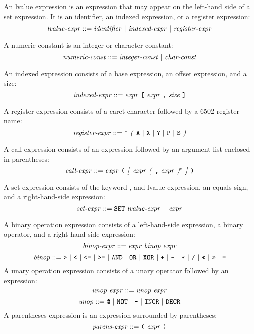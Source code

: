 \documentclass[10pt]{article}
\begin{document}
  An lvalue expression is an expression
that may appear on the left-hand side of a set expression.  It is an
identifier, an indexed expression, or a register expression:
%
$$\mbox{\textit{lvalue-expr}} ::= \mbox{\ensuremath{\mbox{\textit{identifier}}} $|$
  \ensuremath{\mbox{\textit{indexed-expr}}} $|$ \ensuremath{\mbox{\textit{register-expr}}}}$$

  A numeric constant is an integer or
character constant:
%
$$\mbox{\textit{numeric-const}} ::= \mbox{\ensuremath{\mbox{\textit{integer-const}}} $|$
  \ensuremath{\mbox{\textit{char-const}}}}$$
%

 An indexed expression consists of a
base expression, an offset expression, and a size:
%
$$\mbox{\textit{indexed-expr}} ::= \mbox{\ensuremath{\mbox{\textit{expr}}} \texttt{[}
    \ensuremath{\mbox{\textit{expr}}} \texttt{,} \ensuremath{\mbox{\textit{size}}} \texttt{]}}$$
%

 A register expression consists of a
caret character followed by a 6502 register name:
%
$$\mbox{\textit{register-expr}} ::= \mbox{\texttt{\^} \textit{(} \texttt{A} $|$
    \texttt{X} $|$ \texttt{Y} $|$ \texttt{P} $|$ \texttt{S} \textit{)}}$$
%

 A call expression consists of an expression
followed by an argument list enclosed in parentheses:
%
$$\mbox{\textit{call-expr}} ::= \mbox{\ensuremath{\mbox{\textit{expr}}} \texttt{(}
  \textit{[} \ensuremath{\mbox{\textit{expr}}} \textit{(} \texttt{,} \ensuremath{\mbox{\textit{expr}}} \textit{)}$^*$ \textit{]} \texttt{)}}$$
%


 A set expression consists of the keyword
, and lvalue expression, an equals sign, and a
right-hand-side expression:
%
$$\mbox{\textit{set-expr}} ::= \mbox{\texttt{SET} \ensuremath{\mbox{\textit{lvalue-expr}}} \texttt{=}
  \ensuremath{\mbox{\textit{expr}}}}$$
%

 A binary operation expression
consists of a left-hand-side expression, a binary operator, and a
right-hand-side expression:
%
$$\mbox{\textit{binop-expr}} ::= \mbox{\ensuremath{\mbox{\textit{expr}}} \ensuremath{\mbox{\textit{binop}}} \ensuremath{\mbox{\textit{expr}}}}$$
%
$$\mbox{\textit{binop}} ::= \mbox{\texttt{>} $|$ \texttt{<} $|$ \texttt{<=} $|$
  \texttt{>=} $|$ \texttt{AND} $|$ \texttt{OR} $|$ \texttt{XOR} $|$ \texttt{+} $|$
  \texttt{-} $|$ \texttt{*} $|$ \texttt{/} $|$ \texttt{<<} $|$ \texttt{>>} $|$
  \texttt{=}}$$
%
 A unary operation expression
consists of a unary operator followed by an expression:
%
$$\mbox{\textit{unop-expr}} ::= \mbox{\ensuremath{\mbox{\textit{unop}}} \ensuremath{\mbox{\textit{expr}}}}$$
%
$$\mbox{\textit{unop}} ::= \mbox{\texttt{@} $|$ \texttt{NOT} $|$ \texttt{-} $|$
  \texttt{INCR} $|$ \texttt{DECR}}$$
%
 A parentheses expression is an
expression surrounded by parentheses:
%
$$\mbox{\textit{parens-expr}} ::= \mbox{\texttt{(} \ensuremath{\mbox{\textit{expr}}} \texttt{)}}$$
%
\end{document}
